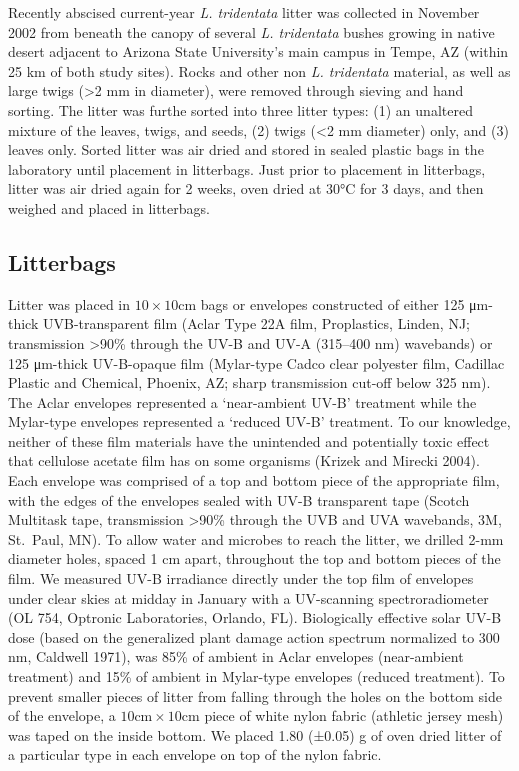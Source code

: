 \documentclass[
]{article}
\begin{document}
Recently abscised current-year \emph{L. tridentata} litter was collected
in November 2002 from beneath the canopy of several \emph{L. tridentata}
bushes growing in native desert adjacent to Arizona State University's
main campus in Tempe, AZ (within 25 km of both study sites). Rocks and
other non \emph{L. tridentata} material, as well as large twigs
(\textgreater2 mm in diameter), were removed through sieving and hand
sorting. The litter was furthe sorted into three litter types: (1) an
unaltered mixture of the leaves, twigs, and seeds, (2) twigs (\textless2
mm diameter) only, and (3) leaves only. Sorted litter was air dried and
stored in sealed plastic bags in the laboratory until placement in
litterbags. Just prior to placement in litterbags, litter was air dried
again for 2 weeks, oven dried at 30°C for 3 days, and then weighed and
placed in litterbags.

\subsection{Litterbags}\label{litterbags}

Litter was placed in \(10 \times 10 \text{cm}\) bags or envelopes
constructed of either 125 \unit{\micro\metre}-thick UVB-transparent film
(Aclar Type 22A film, Proplastics, Linden, NJ; transmission
\textgreater90\% through the UV-B and UV-A (315--400 nm) wavebands) or
125 \unit{\micro\metre}-thick UV-B-opaque film (Mylar-type Cadco clear
polyester film, Cadillac Plastic and Chemical, Phoenix, AZ; sharp
transmission cut-off below 325 nm). The Aclar envelopes represented a
`near-ambient UV-B' treatment while the Mylar-type envelopes represented
a `reduced UV-B' treatment. To our knowledge, neither of these film
materials have the unintended and potentially toxic effect that
cellulose acetate film has on some organisms (Krizek and Mirecki 2004).
Each envelope was comprised of a top and bottom piece of the appropriate
film, with the edges of the envelopes sealed with UV-B transparent tape
(Scotch Multitask tape, transmission \textgreater90\% through the UVB
and UVA wavebands, 3M, St.~Paul, MN). To allow water and microbes to
reach the litter, we drilled 2-mm diameter holes, spaced 1 cm apart,
throughout the top and bottom pieces of the film. We measured UV-B
irradiance directly under the top film of envelopes under clear skies at
midday in January with a UV-scanning spectroradiometer (OL 754, Optronic
Laboratories, Orlando, FL). Biologically effective solar UV-B dose
(based on the generalized plant damage action spectrum normalized to 300
nm, Caldwell 1971), was 85\% of ambient in Aclar envelopes (near-ambient
treatment) and 15\% of ambient in Mylar-type envelopes (reduced
treatment). To prevent smaller pieces of litter from falling through the
holes on the bottom side of the envelope, a
\(10 \text{cm} \times 10 \text{cm}\) piece of white nylon fabric
(athletic jersey mesh) was taped on the inside bottom. We placed 1.80
(±0.05) g of oven dried litter of a particular type in each envelope on
top of the nylon fabric.
\end{document}
